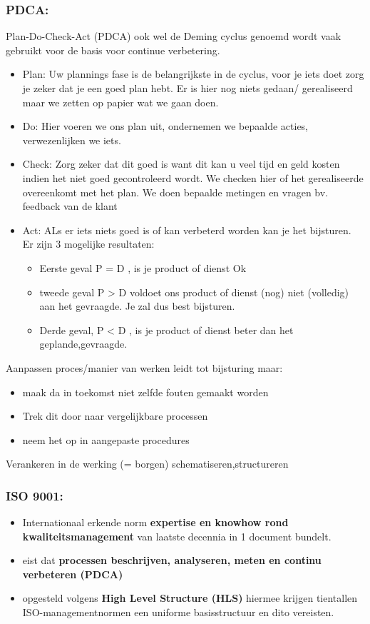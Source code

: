 \documentclass[12pt]{article}
\begin{document}
\subsubsection{PDCA:}
Plan-Do-Check-Act (PDCA) ook wel de Deming cyclus genoemd wordt vaak gebruikt voor de basis voor continue verbetering. \begin{itemize}
    \item Plan: Uw plannings fase is de belangrijkste in de cyclus, voor je iets doet zorg je zeker dat je een goed plan hebt. Er is hier nog niets gedaan/ gerealiseerd maar we zetten op papier wat we gaan doen.
    \item Do: Hier voeren we ons plan uit, ondernemen we bepaalde acties, verwezenlijken we iets.
    \item Check: Zorg zeker dat dit goed is want dit kan u veel tijd en geld kosten indien het niet goed gecontroleerd wordt. We checken hier of het gerealiseerde overeenkomt met het plan. We doen bepaalde metingen en vragen bv. feedback van de klant
    \item Act: ALs er iets niets goed is of kan verbeterd worden kan je het bijsturen.
    Er zijn 3 mogelijke resultaten:\begin{itemize}
        \item Eerste geval P = D , is je product of dienst Ok 
        \item tweede geval P > D voldoet ons product of dienst (nog) niet (volledig) aan het gevraagde. Je zal dus best bijsturen.
        \item Derde geval, P < D , is je product of dienst beter dan het geplande,gevraagde.
    \end{itemize}
\end{itemize}
Aanpassen proces/manier van werken leidt tot bijsturing maar:\begin{itemize}
    \item maak da in toekomst niet zelfde fouten gemaakt worden
    \item Trek dit door naar vergelijkbare processen
    \item neem het op in aangepaste procedures
\end{itemize}
Verankeren in de werking (= borgen)
schematiseren,structureren
\subsubsection{ISO 9001:}
\begin{itemize}
    \item Internationaal erkende norm \textbf{expertise en knowhow rond kwaliteitsmanagement} van laatste decennia in 1 document bundelt.
    \item eist dat \textbf{processen beschrijven, analyseren, meten en continu verbeteren (PDCA)}
    \item opgesteld volgens \textbf{High Level Structure (HLS)} hiermee krijgen tientallen ISO-managementnormen een uniforme basisstructuur en dito vereisten.
\end{itemize}
\end{document}
